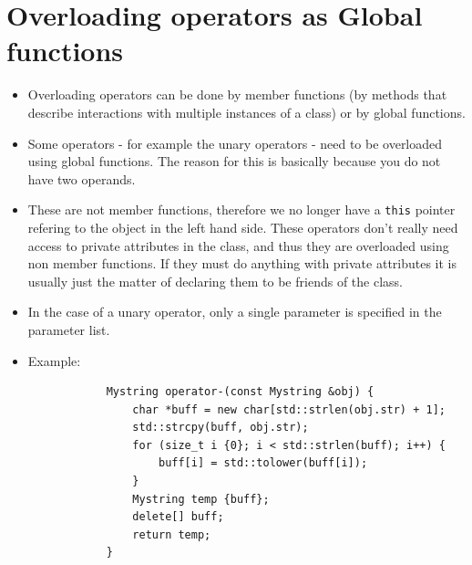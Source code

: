 \section{Overloading operators as Global functions}
\begin{itemize}
    \item Overloading operators can be done by member functions (by methods that describe interactions with multiple instances of a class) or by global functions.
    \item Some operators - for example the unary operators - need to be overloaded using global functions. The reason for this is basically because you do not have two operands.
    \item These are not member functions, therefore we no longer have a \texttt{this} pointer refering to the object in the left hand side. These operators don't really need access to private attributes in the class, and thus they are overloaded using non member functions. If they must do anything with private attributes it is usually just the matter of declaring them to be friends of the class.
    \item In the case of a unary operator, only a single parameter is specified in the parameter list.
    \item Example:
        \begin{verbatim}
            Mystring operator-(const Mystring &obj) {
                char *buff = new char[std::strlen(obj.str) + 1];
                std::strcpy(buff, obj.str);
                for (size_t i {0}; i < std::strlen(buff); i++) {
                    buff[i] = std::tolower(buff[i]);
                }
                Mystring temp {buff};
                delete[] buff;
                return temp;
            }
        \end{verbatim}
\end{itemize}

